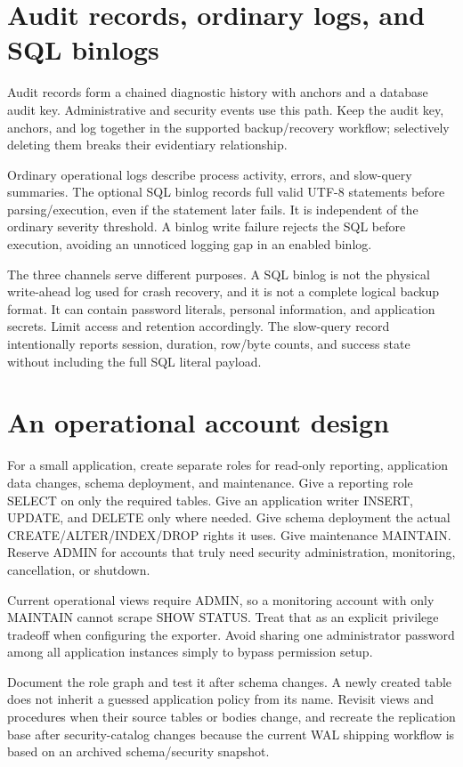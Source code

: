 
\section{Audit records, ordinary logs, and SQL binlogs}

Audit records form a chained diagnostic history with anchors and a database
audit key. Administrative and security events use this path. Keep the audit
key, anchors, and log together in the supported backup/recovery workflow;
selectively deleting them breaks their evidentiary relationship.

Ordinary operational logs describe process activity, errors, and slow-query
summaries. The optional SQL binlog records full valid UTF-8 statements before
parsing/execution, even if the statement later fails. It is independent of the
ordinary severity threshold. A binlog write failure rejects the SQL before
execution, avoiding an unnoticed logging gap in an enabled binlog.

The three channels serve different purposes. A SQL binlog is not the physical
write-ahead log used for crash recovery, and it is not a complete logical
backup format. It can contain password literals, personal information, and
application secrets. Limit access and retention accordingly. The slow-query
record intentionally reports session, duration, row/byte counts, and success
state without including the full SQL literal payload.


\section{An operational account design}

For a small application, create separate roles for read-only reporting,
application data changes, schema deployment, and maintenance. Give a reporting
role SELECT on only the required tables. Give an application writer INSERT,
UPDATE, and DELETE only where needed. Give schema deployment the actual
CREATE/ALTER/INDEX/DROP rights it uses. Give maintenance MAINTAIN. Reserve
ADMIN for accounts that truly need security administration, monitoring,
cancellation, or shutdown.

Current operational views require ADMIN, so a monitoring account with only
MAINTAIN cannot scrape SHOW STATUS. Treat that as an explicit privilege tradeoff
when configuring the exporter. Avoid sharing one administrator password among
all application instances simply to bypass permission setup.

Document the role graph and test it after schema changes. A newly created
table does not inherit a guessed application policy from its name. Revisit
views and procedures when their source tables or bodies change, and recreate
the replication base after security-catalog changes because the current WAL
shipping workflow is based on an archived schema/security snapshot.

